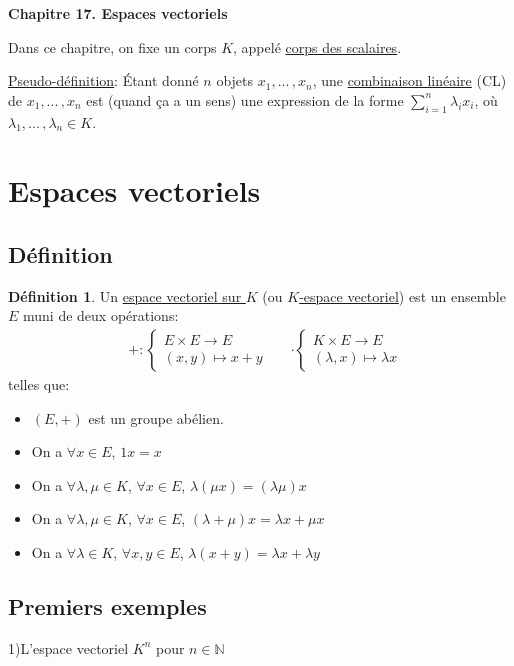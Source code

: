 \documentclass[10pt,a4paper]{article}
\theoremstyle{definition}
\newtheorem{definition}[proposition]{Définition}
\begin{document}
\renewcommand{\labelitemi}{$*$}
\renewcommand{\labelenumi}{(\roman{enumi})}
\begin{center}
{\Large \textbf{Chapitre 17. Espaces vectoriels}}
\end{center}
Dans ce chapitre, on fixe un corps $K$, appelé \uline{corps des scalaires}. \medskip

\uline{Pseudo-définition}: Étant donné $n$ objets $x_1, ...\, , x_n$, une \uline{combinaison linéaire} (CL) de $x_1, ...\, , x_n$ est (quand ça a un sens) une expression de la forme $\sum\limits_{i = 1}^n \lambda_i x_i$, où $\lambda_1, ...\, , \lambda_n \in K$.

\section{Espaces vectoriels}
\subsection{Définition}
\begin{definition}
Un \uline{espace vectoriel sur $K$} (ou \uline{$K$-espace vectoriel}) est un ensemble $E$ muni de deux opérations:
\begin{align*}
&+: \begin{cases}
E \times E \to E \\
(x, y) \mapsto x + y
\end{cases}
&
&\cdot \begin{cases}
K \times E \to E \\
(\lambda, x) \mapsto \lambda x
\end{cases}
\end{align*}
telles que:
\begin{itemize}
\item $(E, +)$ est un groupe abélien.
\item On a $\forall x \in E$, $1 x = x$
\item On a $\forall \lambda, \mu \in K$, $\forall x \in E$, $\lambda(\mu x) = (\lambda \mu)x$
\item On a $\forall \lambda, \mu \in K$, $\forall x \in E$, $(\lambda + \mu) x = \lambda x + \mu x$
\item On a $\forall \lambda \in K$, $\forall x, y \in E$, $\lambda (x + y) = \lambda x + \lambda y$
\end{itemize}
\end{definition}

\subsection{Premiers exemples}
1)L'espace vectoriel $K^n$ pour $n \in \mathbb{N}$
\end{document}
